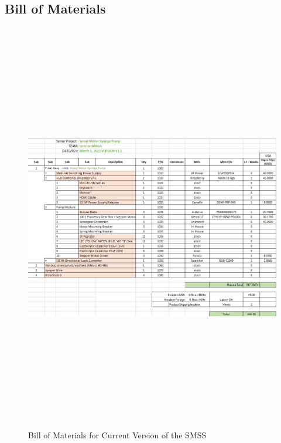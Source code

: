 \documentclass[journal]{IEEEtran}
\begin{document}
    \subsection{Bill of Materials}
        \begin{figure}[H]
            \centering
            \includegraphics[width = 18cm, height = 18cm]{BoM}
            \caption{Bill of Materials for Current Version of the SMSS}
            \label{fig:BoM}
        \end{figure}
        
        \newpage
        \quad
        \newpage
        
\end{document}
